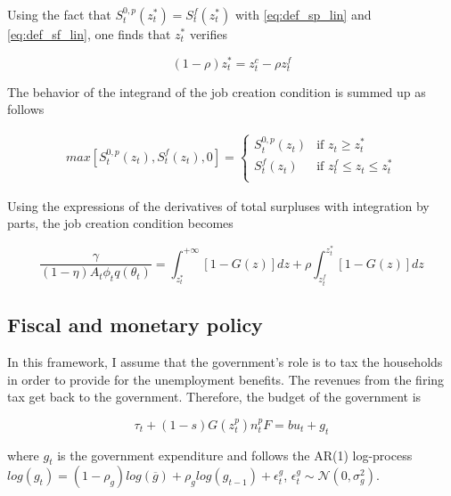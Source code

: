Using the fact that $S_t^{0,p} \left( z_t^* \right) = S_t^{f} \left( z_t^* \right)$ with \eqref{eq:def_sp_lin} and \eqref{eq:def_sf_lin}, one finds that $z_t^*$ verifies

\begin{equation}
(1-\rho) z_t^* = z_t^c - \rho z_t^f \label{eq:zs}
\end{equation}

The behavior of the integrand of the job creation condition is summed up as follows

\begin{align*}
max \left[ S_t^{0,p} \left( z_t \right) , S_t^{f} \left( z_t \right), 0\right] = \left\{
\begin{array}{ll}
S_t^{0,p} \left( z_t \right) & \text{if } z_t \geq z_t^*\\
S_t^{f} \left( z_t \right) & \text{if } z_t^f \leq z_t \leq z_t^*\\
\end{array}
\right.
\end{align*}

Using the expressions of the derivatives of total surpluses with integration by parts, the job creation condition becomes

\begin{equation}
\frac{\gamma}{(1-\eta) A_t \phi_t q\left( \theta_t \right)} = \int_{z_t^*}^{+\infty} \left[ 1 - G(z) \right] dz + \rho \int_{z_t^f}^{z_t^*} \left[ 1 - G(z) \right] dz \label{eq:jc}
\end{equation}

\subsection{Fiscal and monetary policy}

In this framework, I assume that the government's role is to tax the households in order to provide for the unemployment benefits. The revenues from the firing tax get back to the government.  Therefore, the budget of the government is

\begin{equation}
\tau_t + (1-s) G\left( z_t^p \right) n_t^p F = b u_t + g_t
\end{equation}

where $g_t$ is the government expenditure and follows the AR(1) log-process $log\left(g_t\right) = \left(1-\rho_g\right) log\left(\overline{g}\right) + \rho_g log\left( g_{t-1} \right) + \epsilon_t^g$, $\epsilon_t^g \sim \mathcal{N} \left( 0, \sigma_g^2 \right)$.

